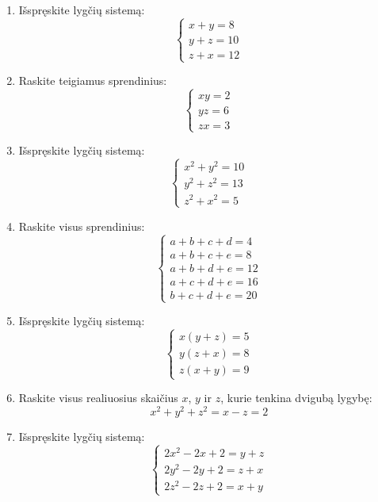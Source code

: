 \documentclass[11pt,a4paper]{scrartcl}
\begin{document}
\begin{enumerate}
    \renewcommand{\labelenumi}{\textbf{\theenumi.}}

    \item Išspręskite lygčių sistemą:
    \[
    \left\{
    \begin{array}{l}
    x+y=8\\
    y+z=10\\
    z+x=12
    \end{array}
    \right.
    \]

    \item Raskite teigiamus sprendinius:
    \[
    \left\{
    \begin{array}{l}
    xy=2\\
    yz=6\\
    zx=3
    \end{array}
    \right.
    \]

    \item Išspręskite lygčių sistemą:
    \[
    \left\{
    \begin{array}{l}
    x^2+y^2=10\\
    y^2+z^2=13\\
    z^2+x^2=5
    \end{array}
    \right.
    \]

    \item Raskite visus sprendinius:
    \[
    \left\{
    \begin{array}{l}
    a+b+c+d=4\\
    a+b+c+e=8\\
    a+b+d+e=12\\
    a+c+d+e=16\\
    b+c+d+e=20
    \end{array}
    \right.
    \]

    \item Išspręskite lygčių sistemą:
    \[
    \left\{
    \begin{array}{l}
    x(y+z)=5\\
    y(z+x)=8\\
    z(x+y)=9
    \end{array}
    \right.
    \]

    \item Raskite visus realiuosius skaičius $x$, $y$ ir $z$, kurie tenkina dvigubą lygybę:
    \[ x^2+y^2+z^2=x-z=2 \]

    \item Išspręskite lygčių sistemą:
    \[
    \left\{
    \begin{array}{l}
    2x^2-2x+2=y+z\\
    2y^2-2y+2=z+x\\
    2z^2-2z+2=x+y
    \end{array}
    \right.
    \]


\end{enumerate}
\end{document}
